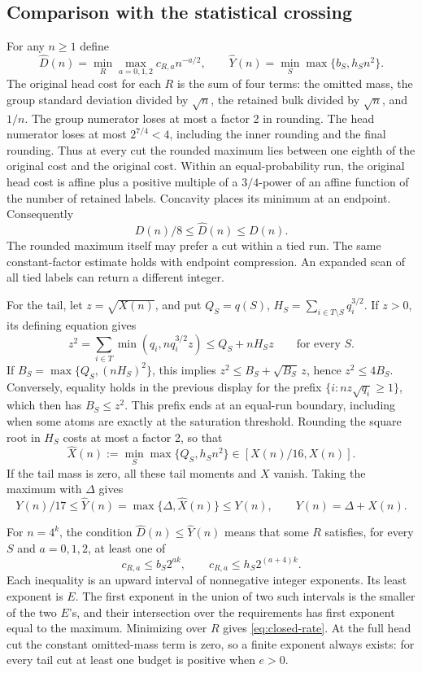 \subsection{Comparison with the statistical crossing}

For any \(n\ge1\) define
\[
 \widehat D(n)=\min_R\max_{a=0,1,2}c_{R,a}n^{-a/2},
 \qquad
 \widehat Y(n)=\min_S\max\{b_S,h_Sn^2\}.
\]
The original head cost for each \(R\) is the sum of four terms:
the omitted mass, the group standard deviation divided by \(\sqrt n\),
the retained bulk divided by \(\sqrt n\), and \(1/n\).
The group numerator loses at most a factor 2 in rounding. The
head numerator loses at most \(2^{7/4}<4\), including the inner
rounding and the final rounding. Thus at every cut the rounded
maximum lies between one eighth of the original cost and the
original cost. Within an equal-probability run, the original head
cost is affine plus a positive multiple of a \(3/4\)-power of an
affine function of the number of retained labels. Concavity places
its minimum at an endpoint. Consequently
\begin{equation}
  D(n)/8\le\widehat D(n)\le D(n).
  \label{eq:closed-head-comparison}
\end{equation}
The rounded maximum itself may prefer a cut within a tied run.
The same constant-factor estimate holds with endpoint compression.
An expanded scan of all tied labels can return a different integer.

For the tail, let \(z=\sqrt{X(n)}\), and put
\(Q_S=q(S)\), \(H_S=\sum_{i\in T\setminus S}q_i^{3/2}\).
If \(z>0\), its defining equation gives
\[
 z^2=\sum_{i\in T}\min(q_i,nq_i^{3/2}z)
       \le Q_S+nH_Sz
       \qquad\text{for every }S.
\]
If \(B_S=\max\{Q_S,(nH_S)^2\}\), this implies
\(z^2\le B_S+\sqrt{B_S}\,z\), hence \(z^2\le4B_S\).
Conversely, equality holds in the previous display for the prefix
\(\{i:nz\sqrt{q_i}\ge1\}\), which then has \(B_S\le z^2\).
This prefix ends at an equal-run boundary, including when some
atoms are exactly at the saturation threshold. Rounding the square
root in \(H_S\) costs at most a factor 2, so that
\[
 \widehat X(n):=\min_S\max\{Q_S,h_Sn^2\}\in[X(n)/16,X(n)].
\]
If the tail mass is zero, all these tail moments and \(X\) vanish.
Taking the maximum with \(\Delta\) gives
\begin{equation}
  Y(n)/17\le\widehat Y(n)=\max\{\Delta,\widehat X(n)\}\le Y(n),
  \qquad Y(n)=\Delta+X(n).
  \label{eq:closed-tail-comparison}
\end{equation}

For \(n=4^k\), the condition \(\widehat D(n)\le\widehat Y(n)\)
means that some \(R\) satisfies, for every \(S\) and \(a=0,1,2\),
at least one of
\[
 c_{R,a}\le b_S2^{ak},
 \qquad c_{R,a}\le h_S2^{(a+4)k}.
\]
Each inequality is an upward interval of nonnegative integer
exponents. Its least exponent is \(E\). The first exponent in
the union of two such intervals is the smaller of the two
\(E\)'s, and their intersection over the requirements has first
exponent equal to the maximum. Minimizing over \(R\) gives
\eqref{eq:closed-rate}. At the full head cut the constant
omitted-mass term is zero, so a finite exponent always exists:
for every tail cut at least one budget is positive when \(e>0\).


